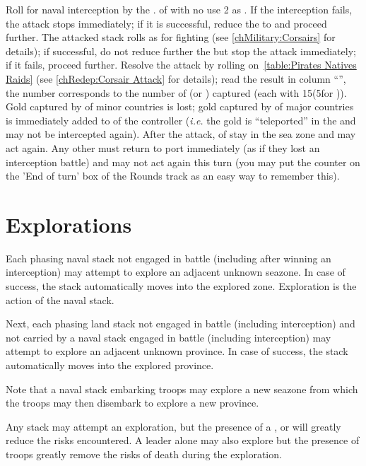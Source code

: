 \bparag Roll for naval interception by the \corsaire. \corsaire of
 with no \LeaderA use 2 as \Man.
\bparag If the interception fails, the attack stops immediately; if it is
successful, reduce the \corsaire to \Facemoins and proceed further.
\bparag The attacked stack rolls as for fighting \corsaire (see
\ref{chMilitary:Corsairs} for details); if successful, do not reduce further
the \corsaire but stop the attack immediately; if it fails, proceed further.
\bparag Resolve the attack by rolling on~\ref{table:Pirates Natives Raids}
(see \ref{chRedep:Corsair Attack} for details); read the result in column
``\TradeFLEET\faceplus'', the number corresponds to the number of \NTD (or
\NWD) captured (each with 15\ducats (5\ducats for \NWD)).
\bparag Gold captured by \corsaire of minor countries is lost; gold captured by
\corsaire of major countries is immediately added to
 of the controller (\emph{i.e.} the gold
is ``teleported'' in the \RT and may not be intercepted again).
\bparag After the attack, \corsaire of  stay in the sea zone and
may act again. Any other \corsaire must return to port immediately (as if they
lost an interception battle) and may not act again this turn (you may put the
counter on the 'End of turn' box of the Rounds track as an easy way to
remember this).

\section{Explorations}\label{chMilitary:Discoveries}
\label{chMilitary:Exploration}
Each phasing naval stack not engaged in battle (including after winning an
interception) may attempt to explore an adjacent unknown seazone. In case of
success, the stack automatically moves into the explored zone. Exploration is
the action of the naval stack.

Next, each phasing land stack not engaged in battle (including interception)
and not carried by a naval stack engaged in battle (including interception)
may attempt to explore an adjacent unknown province. In case of success, the
stack automatically moves into the explored province.

Note that a naval stack embarking troops may explore a new seazone from which
the troops may then disembark to explore a new province.

Any stack may attempt an exploration, but the presence of a \LeaderE, \LeaderC
or \LeaderGov will greatly reduce the risks encountered. A leader alone may
also explore but the presence of troops greatly remove the risks of death
during the exploration.


